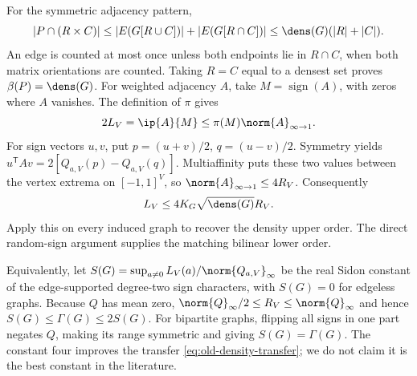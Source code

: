 For the symmetric adjacency pattern,
\[
 |P\cap(R\times C)|\le|E(G[R\cup C])|+|E(G[R\cap C])|
                   \le\dens(G)(|R|+|C|).
\]
An edge is counted at most once unless both endpoints lie in $R\cap C$,
when both matrix orientations are counted. Taking $R=C$ equal to a densest
set proves $\beta(P)=\dens(G)$. For weighted adjacency $A$, take
$M=\operatorname{sign}(A)$, with zeros where $A$ vanishes. The definition
of $\pi$ gives
\[
 2L_V=\ip{A}{M}\le\pi(M)\norm{A}_{\infty\to1}.
\]
For sign vectors $u,v$, put $p=(u+v)/2$, $q=(u-v)/2$. Symmetry yields
$u^{\mathsf T}Av=2[Q_{a,V}(p)-Q_{a,V}(q)]$. Multiaffinity puts these two
values between the vertex extrema on $[-1,1]^V$, so
$\norm{A}_{\infty\to1}\le4R_V$. Consequently
\begin{equation}\label{eq:old-density-transfer}
 L_V\le4K_G\sqrt{\dens(G)}R_V.
\end{equation}
Apply this on every induced graph to recover the density upper order.
The direct random-sign argument supplies the matching bilinear lower order.

Equivalently, let
$S(G)=\sup_{a\ne0}L_V(a)/\norm{Q_{a,V}}_\infty$ be the real Sidon
constant of the edge-supported degree-two sign characters, with $S(G)=0$
for edgeless graphs. Because $Q$
has mean zero,
$\norm{Q}_\infty/2\le R_V\le\norm{Q}_\infty$ and hence
$S(G)\le\Gamma(G)\le2S(G)$. For bipartite graphs, flipping all signs in
one part negates $Q$, making its range symmetric and giving
$S(G)=\Gamma(G)$. The constant four improves the transfer
\eqref{eq:old-density-transfer};
we do not claim it is the best constant in the literature.
